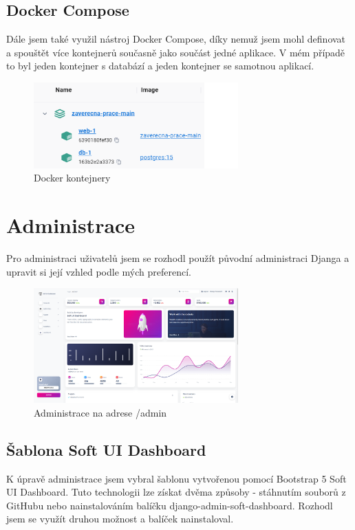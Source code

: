 \documentclass[12pt, a4paper,
twoside,        %
openright
]{report}
\begin{document}
\subsection{Docker Compose}
Dále jsem také využil nástroj Docker Compose, díky nemuž jsem mohl definovat a spouštět více kontejnerů současně jako součást jedné aplikace. V mém případě to byl jeden kontejner s databází a jeden kontejner se samotnou aplikací.
	\begin{figure}[h!]
		\centering
		\includegraphics[width=0.7\textwidth]{image/kontejnery.png}
		\caption{Docker kontejnery}
		\label{fig:dockerkontejnery}
	\end{figure}

\section{Administrace}
\label{sec:administrace}
Pro administraci uživatelů jsem se rozhodl použít původní administraci Djanga a upravit si její vzhled podle mých preferencí.
	\begin{figure}[h!]
		\centering
		\includegraphics[width=0.7\textwidth]{image/administrace.png}
		\caption{Administrace na adrese /admin}
		\label{fig:administracesoftuidashboard}
	\end{figure}
\subsection{Šablona Soft UI Dashboard}
K úpravě administrace jsem vybral šablonu vytvořenou pomocí Bootstrap 5 Soft UI Dashboard. Tuto technologii lze získat dvěma způsoby - stáhnutím souborů z GitHubu nebo nainstalováním balíčku django-admin-soft-dashboard. Rozhodl jsem se využít druhou možnost a balíček nainstaloval. 
\end{document}
